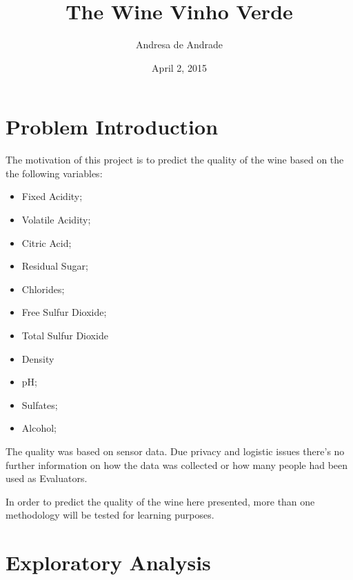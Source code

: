 \documentclass[]{article}
\title{The Wine Vinho Verde}
\author{Andresa de Andrade}
\date{April 2, 2015}
\begin{document}
\maketitle


{
\hypersetup{linkcolor=black}
\setcounter{tocdepth}{2}
\tableofcontents
}
\newpage 

\section{Problem Introduction}\label{problem-introduction}

The motivation of this project is to predict the quality of the wine
based on the the following variables:

\begin{itemize}
\itemsep1pt\parskip0pt
\item
  Fixed Acidity;
\item
  Volatile Acidity;
\item
  Citric Acid;
\item
  Residual Sugar;
\item
  Chlorides;
\item
  Free Sulfur Dioxide;
\item
  Total Sulfur Dioxide
\item
  Density
\item
  pH;
\item
  Sulfates;
\item
  Alcohol;
\end{itemize}

The quality was based on sensor data. Due privacy and logistic issues
there's no further information on how the data was collected or how many
people had been used as Evaluators.

In order to predict the quality of the wine here presented, more than
one methodology will be tested for learning purposes.

\section{Exploratory Analysis}\label{exploratory-analysis}
\end{document}
